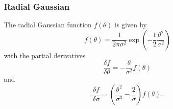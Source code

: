 \documentclass{article}[12pt,a4]
\begin{document}
\subsubsection{Radial Gaussian}

The radial Gaussian function $f(\theta)$ is given by
\begin{equation}
f(\theta) = \frac{1}{2 \pi \sigma^2} \exp \left( -\frac{1}{2} \frac{\theta^2}{\sigma^2} \right)
\end{equation}
with the partial derivatives
\begin{equation}
\frac{\delta f}{\delta \theta}  = - \frac{\theta}{\sigma^2} f(\theta)
\end{equation}
and
\begin{equation}
\frac{\delta f}{\delta \sigma}  = \left( \frac{\theta^2}{\sigma^3} - \frac{2}{\sigma} \right) f(\theta) .
\end{equation}
\end{document}
